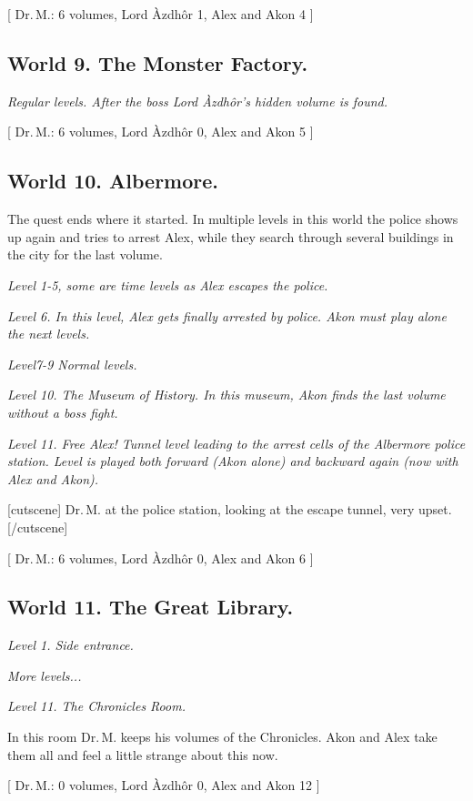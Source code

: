 \documentclass{gd-document}
\newcommand\DrM{Dr.\,M.\xspace}
\newcommand\Azdhor{Lord Àzdhôr\xspace}
\newcommand\level[1]{\textit{#1}}
\begin{document}
[ \DrM: 6 volumes, \Azdhor 1, Alex and Akon 4 ]

\subsection{World 9. The Monster Factory.}

\level{Regular levels. After the boss \Azdhor’s hidden volume is
  found.}

[ \DrM: 6 volumes, \Azdhor 0, Alex and Akon 5 ]

\subsection{World 10. Albermore.}

The quest ends where it started. In multiple levels in this world the
police shows up again and tries to arrest Alex, while they search
through several buildings in the city for the last volume.

\level{Level 1-5, some are time levels as Alex escapes the police.}

\level{Level 6. In this level, Alex gets finally arrested by
  police. Akon must play alone the next levels.}

\level{Level7-9 Normal levels.}

\level{Level 10. The Museum of History. In this museum, Akon finds the
  last volume without a boss fight.}

\level{Level 11. Free Alex! Tunnel level leading to the arrest cells
  of the Albermore police station. Level is played both forward (Akon
  alone) and backward again (now with Alex and Akon).}

[cutscene]
\DrM at the police station, looking at the escape tunnel, very upset.
[/cutscene]

[ \DrM: 6 volumes, \Azdhor 0, Alex and Akon 6 ]

\subsection{World 11. The Great Library.}

\level{Level 1. Side entrance.}

\level{More levels...}

\level{Level 11. The Chronicles Room.}

In this room \DrM keeps his volumes of the Chronicles. Akon and Alex
take them all and feel a little strange about this now.

[ \DrM: 0 volumes, \Azdhor 0, Alex and Akon 12 ]
\end{document}
